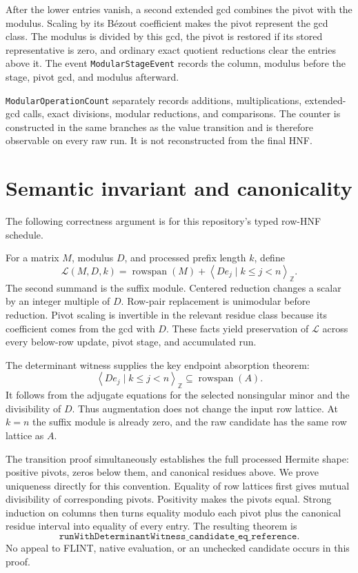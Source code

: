 \documentclass[11pt]{article}
\newcommand{\code}[1]{\texttt{#1}}
\newcommand{\Z}{\mathbb{Z}}
\newcommand{\spanrows}{\operatorname{rowspan}}
\begin{document}
After the lower entries vanish, a second extended gcd combines the pivot with
the modulus.  Scaling by its B\'ezout coefficient makes the pivot represent
the gcd class.  The modulus is divided by this gcd, the pivot is restored if
its stored representative is zero, and ordinary exact quotient reductions
clear the entries above it.  The event
\code{ModularStageEvent} records the column, modulus before the stage, pivot
gcd, and modulus afterward.

\code{ModularOperationCount} separately records additions, multiplications,
extended-gcd calls, exact divisions, modular reductions, and comparisons.
The counter is constructed in the same branches as the value transition and
is therefore observable on every raw run.  It is not reconstructed from the
final HNF.

\section{Semantic invariant and canonicality}

The following correctness argument is for this repository's typed row-HNF
schedule.

For a matrix $M$, modulus $D$, and processed prefix length $k$, define
\[
  \mathcal L(M,D,k)=
    \spanrows(M)+
    \left\langle D e_j\mid k\le j<n\right\rangle_{\Z}.
\]
The second summand is the suffix module.  Centered reduction changes a scalar
by an integer multiple of $D$.  Row-pair replacement is unimodular before
reduction.  Pivot scaling is invertible in the relevant residue class because
its coefficient comes from the gcd with $D$.  These facts yield preservation
of $\mathcal L$ across every below-row update, pivot stage, and accumulated
run.

The determinant witness supplies the key endpoint absorption theorem:
\[
  \left\langle D e_j\mid k\le j<n\right\rangle_{\Z}
  \subseteq \spanrows(A).
\]
It follows from the adjugate equations for the selected nonsingular minor and
the divisibility of $D$.  Thus augmentation does not change the input row
lattice.  At $k=n$ the suffix module is already zero, and the raw candidate
has the same row lattice as $A$.

The transition proof simultaneously establishes the full processed Hermite
shape: positive pivots, zeros below them, and canonical residues above.  We
prove uniqueness directly for this convention.  Equality of row lattices
first gives mutual divisibility of corresponding pivots.  Positivity makes
the pivots equal.  Strong induction on columns then turns equality modulo each
pivot plus the canonical residue interval into equality of every entry.  The
resulting theorem is
\[
  \code{runWithDeterminantWitness\_candidate\_eq\_reference}.
\]
No appeal to FLINT, native evaluation, or an unchecked candidate occurs in
this proof.
\end{document}
